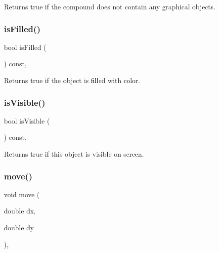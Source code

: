 Returns true if the compound does not contain any graphical objects. 

\mbox{\label{classGObject_a11c404f106940c201b6f326e0355c150}} 
\subsubsection{\texorpdfstring{is\+Filled()}{isFilled()}}
{\footnotesize\ttfamily bool is\+Filled (\begin{DoxyParamCaption}{ }\end{DoxyParamCaption}) const\hspace{0.3cm}{\ttfamily [virtual]}, {\ttfamily [inherited]}}



Returns {\ttfamily true} if the object is filled with color. 

\mbox{\label{classGObject_a9d8a6cfb13917785c143e74d40e4e2be}} 
\subsubsection{\texorpdfstring{is\+Visible()}{isVisible()}}
{\footnotesize\ttfamily bool is\+Visible (\begin{DoxyParamCaption}{ }\end{DoxyParamCaption}) const\hspace{0.3cm}{\ttfamily [virtual]}, {\ttfamily [inherited]}}



Returns {\ttfamily true} if this object is visible on screen. 

\mbox{\label{classGObject_a5973d8dda83afb36e2c56855515be392}} 
\subsubsection{\texorpdfstring{move()}{move()}}
{\footnotesize\ttfamily void move (\begin{DoxyParamCaption}\item[{double}]{dx,  }\item[{double}]{dy }\end{DoxyParamCaption})\hspace{0.3cm}{\ttfamily [virtual]}, {\ttfamily [inherited]}}



